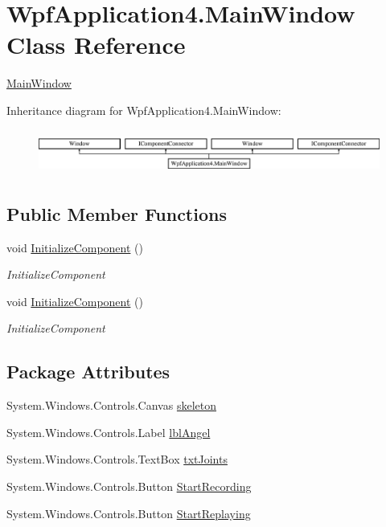 \hypertarget{classWpfApplication4_1_1MainWindow}{\section{Wpf\-Application4.\-Main\-Window Class Reference}
\label{classWpfApplication4_1_1MainWindow}
}


\hyperlink{classWpfApplication4_1_1MainWindow}{Main\-Window}  


Inheritance diagram for Wpf\-Application4.\-Main\-Window\-:\begin{figure}[H]
\begin{center}
\leavevmode
\includegraphics[height=1.489362cm]{classWpfApplication4_1_1MainWindow}
\end{center}
\end{figure}
\subsection*{Public Member Functions}
\begin{DoxyCompactItemize}
\item 
void \hyperlink{classWpfApplication4_1_1MainWindow_ab083c073f35c2d1f18b230aeef1c8a53}{Initialize\-Component} ()
\begin{DoxyCompactList}\small\item\em Initialize\-Component \end{DoxyCompactList}\item 
void \hyperlink{classWpfApplication4_1_1MainWindow_ab083c073f35c2d1f18b230aeef1c8a53}{Initialize\-Component} ()
\begin{DoxyCompactList}\small\item\em Initialize\-Component \end{DoxyCompactList}\end{DoxyCompactItemize}
\subsection*{Package Attributes}
\begin{DoxyCompactItemize}
\item 
System.\-Windows.\-Controls.\-Canvas \hyperlink{classWpfApplication4_1_1MainWindow_ad3ee7f5fe2642960f22f268f3c026990}{skeleton}
\item 
System.\-Windows.\-Controls.\-Label \hyperlink{classWpfApplication4_1_1MainWindow_a827708d162b3b2a34bf06a1c6ddc3b3d}{lbl\-Angel}
\item 
System.\-Windows.\-Controls.\-Text\-Box \hyperlink{classWpfApplication4_1_1MainWindow_a1c0b78db264ed19126b96830a5700bcd}{txt\-Joints}
\item 
System.\-Windows.\-Controls.\-Button \hyperlink{classWpfApplication4_1_1MainWindow_a8df403b3dd51676987f0f00b128cfa2b}{Start\-Recording}
\item 
System.\-Windows.\-Controls.\-Button \hyperlink{classWpfApplication4_1_1MainWindow_aab97058b3cbf0a1b083d1de7f011af39}{Start\-Replaying}
\end{DoxyCompactItemize}
